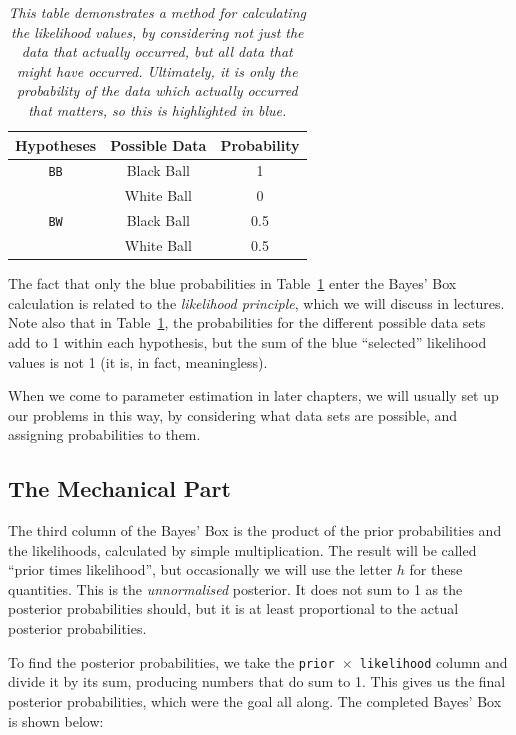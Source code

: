 \begin{table}[ht!]
\begin{center}
\begin{tabular}{|c|c|c|}
\hline
{\bf Hypotheses} & {\bf Possible Data} & {\bf Probability} \\
\hline
{\tt BB} & {\color{blue} Black Ball} & {\color{blue} 1}\\
         & White Ball & 0 \\
\hline
{\tt BW} & {\color{blue} Black Ball} & {\color{blue} 0.5} \\
         & White Ball & 0.5 \\
\hline
\end{tabular}
\caption{\it This table demonstrates a method for calculating the likelihood
values, by considering not just the data that actually occurred, but all
data that might have occurred. Ultimately, it is only the probability of the
data which actually occurred that matters, so this is highlighted in blue.
\label{tab:all_data}}
\end{center}
\end{table}
The fact that only the blue probabilities in Table~\ref{tab:all_data} enter the
Bayes' Box calculation is related to the {\it likelihood principle}, which we
will
discuss in lectures. Note also that in Table~\ref{tab:all_data}, the
probabilities for the different possible data sets add to 1 within each
hypothesis, but the sum of the blue ``selected'' likelihood values is not 1
(it is, in fact, meaningless).

When we come to parameter estimation in later chapters, we will usually set up
our problems in this way, by considering what data sets are possible, and
assigning probabilities to them.

\subsection{The Mechanical Part}
The third column of the Bayes' Box is the product of the prior probabilities
and the likelihoods, calculated by simple multiplication. The result will be
called ``prior times likelihood'', but occasionally we will use the letter $h$
for these quantities. This is the {\it unnormalised} posterior. It does not sum
to 1 as the posterior probabilities should, but it is at least proportional to
the actual posterior probabilities.

To find the posterior probabilities, we take the {\tt prior $\times$ likelihood}
column and divide it by its sum, producing numbers that do sum to 1. This
gives us the final
posterior probabilities, which were the goal all along. The completed Bayes'
Box is shown below:

